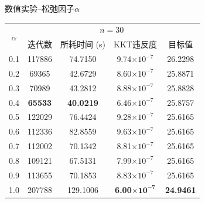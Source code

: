 \documentclass{beamer}
\begin{document}
\begin{frame}{数值实验--松弛因子$\alpha$}
{\begin{table}[htbp]
\begin{tabular}{c|c|c|c|c}
        \multirow{2}{*}{$\alpha$} & \multicolumn{4}{c}{$n=30$}\\\cline{2-5}
          & 迭代数 & 所耗时间 (s) & KKT违反度 & 目标值\\\hline
        0.1 & 117886 & 74.7150 & 9.74$\times10^{-7}$ & 26.2298 \\\hline
        0.2 & 69365 & 42.6729 & 8.60$\times10^{-7}$ & 25.8871 \\\hline
        0.3 & 70989 & 43.2812 & 8.88$\times10^{-7}$ & 25.8828 \\\hline
        0.4 & \textbf{65533} & \textbf{40.0219} & 6.46$\times10^{-7}$ & 25.8757 \\\hline
        0.5 & 122029 & 76.4424 & 9.28$\times10^{-7}$ & 25.6165 \\\hline
        0.6 & 112336 & 82.8559 & 9.63$\times10^{-7}$ & 25.6165 \\\hline
        0.7 & 112002 & 70.1342 & 8.81$\times10^{-7}$ & 25.6165 \\\hline
        0.8 & 109121 & 67.5131 & 7.99$\times10^{-7}$ & 25.6165 \\\hline
        0.9 & 113655 & 70.1853 & 8.83$\times10^{-7}$ & 25.6165 \\\hline
        1.0 & 207788 & 129.1006 & \textbf{6.00$\mathbf{\times10^{-7}}$} & \textbf{24.9461} \\\hline
    \end{tabular}
\end{table}}
\end{frame}

\end{document}
